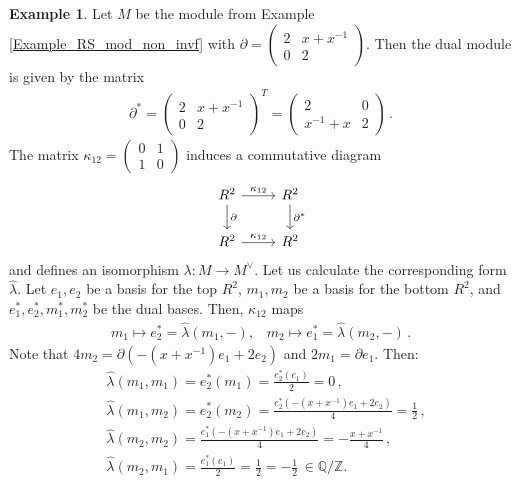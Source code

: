 \documentclass[sn-mathphys-num]{sn-jnl}
\theoremstyle{definition}
\newtheorem{example}[lemma]{Example}
\numberwithin{equation}{section}
\theoremstyle{definition}
\def\pd{\partial}
\def\bZ{\mathbb{Z}}
\def\l{{\lambda}}
\def\hl{{\hat \lambda}}
\begin{document}
\begin{example}\label{example_2}
Let $M$ be the module from Example \ref{Example_RS_mod_non_invf} with $\pd=\begin{pmatrix} 2 & x+x^{-1} \\ 0 & 2 \end{pmatrix}$.
 Then the dual module is given by the matrix
\begin{align}
    \partial^\ast = \begin{pmatrix} 2 & x+x^{-1} \\ 0 & 2 \end{pmatrix}^T = \begin{pmatrix} 2 & 0 \\ x^{-1}+x & 2 \end{pmatrix}\,. 
\end{align}
The matrix $\kappa_{12} = \begin{pmatrix} 0 & 1 \\ 1 & 0 \end{pmatrix}$  induces a commutative diagram
\begin{equation}
\begin{tikzcd}
R^2 \arrow[r, "\kappa_{12}"] \arrow[d, "\partial"] & R^2 \arrow[d, "\partial^\ast"] \\
R^2 \arrow[r, "\kappa_{12}"] & R^2
\end{tikzcd}
\end{equation}
and defines an isomorphism $\l : M \to M^\vee$. Let us calculate the corresponding form $\hl$. Let  $e_1, e_2$ be a basis for the top $R^2$, $m_1, m_2$ be a basis for the bottom $R^2$, and $e_1^\ast,e_2^\ast, m_1^\ast,m_2^\ast$ be the dual bases. Then, $\kappa_{12}$ maps
\begin{align}
 m_1 \mapsto e_2^\ast = \hl(m_1, -),\,\,\,\,\, m_2 \mapsto e_1^\ast = \hl(m_2, -)\,.
 \end{align}
Note that $4m_2 = \partial(-(x+x^{-1})e_1 + 2e_2)$ and $2m_1 = \partial e_1$. Then:
\begin{align}
&\hl(m_1, m_1) = e_2^\ast(m_1) = \frac{e_2^\ast(e_1)}{2} = 0\,,\\
&\hl(m_1, m_2) = e_2^\ast(m_2) = \frac{e_2^\ast(-(x+x^{-1})e_1 + 2e_2)}{4} = \frac{1}{2}\,,\\
&\hl(m_2, m_2) = \frac{e_1^\ast(-(x+x^{-1})e_1 + 2e_2)}{4} = -\frac{x+x^{-1}}{4}\,,\\
&\hl(m_2, m_1) = \frac{e_1^\ast(e_1)}{2} = \frac{1}{2}=-\frac{1}{2}\,\in \mathbb Q/\bZ.
\end{align}  
\end{example}
\vspace{3mm}
\end{document}
